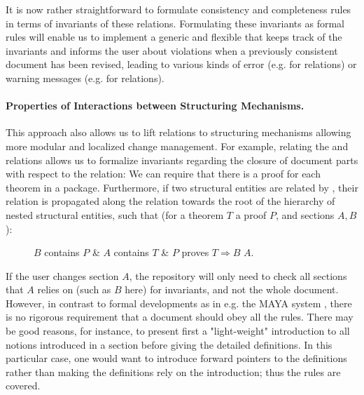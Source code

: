 It is now rather straightforward to formulate consistency and completeness rules in terms
of invariants of these relations. Formulating these invariants as formal rules will enable
us to implement a generic and flexible {} that keeps track of
the invariants and informs the user about violations when a previously consistent document
has been revised, leading to various kinds of error (e.g. for {}
relations) or warning messages (e.g. for {} relations).


\paragraph{Properties of Interactions between Structuring Mechanisms.}
This approach also allows us to lift relations to structuring mechanisms allowing more
modular and localized change management.  For example, relating the {}
and {} relations allows us to formalize invariants regarding the closure
of document parts with respect to the {} relation: We can require that
there is a proof for each theorem in a package.  Furthermore, if two structural entities
are related by {}, their relation is propagated along the
{} relation towards the root of the hierarchy of nested structural
entities, such that (for a theorem $T$ a proof $P$, and sections $A, B$):

\begin{description}
\item[] $B$ contains $P$ \& $A$ contains $T$ \& $P$ proves $T \Rightarrow B$
  {} $A$.
\end{description}


If the user changes section $A$, the repository will only need to check all sections that
$A$ relies on (such as $B$ here) for invariants, and not the whole document. However, in
contrast to formal developments as in e.g. the MAYA system \cite{AH-05-a}, there is no
rigorous requirement that a document should obey all the rules.  There may be good
reasons, for instance, to present first a "light-weight" introduction to all notions
introduced in a section before giving the detailed definitions. In this particular case,
one would want to introduce forward pointers to the definitions rather than making the
definitions rely on the introduction; thus the rules are covered.

